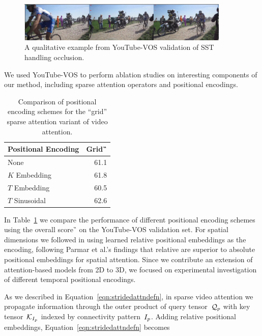 \begin{figure}
\centering
\includegraphics[width=0.9\textwidth]{Figures/aina-occlusion}
\caption{A qualitative example from YouTube-VOS validation of SST handling
         occlusion.}
\label{fig:ainaocclusion}
\end{figure}

We used YouTube-VOS to perform ablation studies on interesting components of
our method, including sparse attention operators and positional encodings.

\begin{table}
\caption{Comparison of positional encoding schemes for the ``grid'' sparse
         attention variant of video attention.}
\centering
\begin{tabular}{lr}
\toprule
Positional Encoding & Grid~\G{} \\
\midrule
None & \num{61.1}  \\
$K$ Embedding & \num{61.8} \\
$T$ Embedding & \num{60.5} \\
$T$ Sinusoidal & \num[math-rm=\mathbf]{62.6} \\
\bottomrule
\end{tabular}
\label{tab:pos-encoding}
\end{table}

In Table~\ref{tab:pos-encoding} we compare the performance of different
positional encoding schemes using the overall score~\G{} on the YouTube-VOS
validation set.
For spatial dimensions we followed \citet{parmar2019standalone} in
using learned relative positional embeddings as the encoding, following Parmar
et al.'s findings that relative are superior to absolute positional embeddings
for spatial attention.
Since we contribute an extension of attention-based models from 2D to 3D, we
focused on experimental investigation of different temporal positional
encodings.

As we described in Equation~\ref{eqn:stridedattndefn}, in sparse video
attention we propagate information through the outer product of query
tensor~$\mathcal{Q}_p$ with key tensor~$\mathcal{K}_{I_p}$ indexed by
connectivity pattern~$I_p$.
Adding relative positional embeddings, Equation~\ref{eqn:stridedattndefn} becomes

